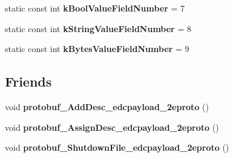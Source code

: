 \begin{DoxyCompactItemize}
\item 
\hypertarget{classedcdatatypes_1_1_edc_payload___edc_metric_af4e33f8c7adc37d9f860fcecbd07c1eb}{static const int {\bfseries k\-Bool\-Value\-Field\-Number} = 7}\label{classedcdatatypes_1_1_edc_payload___edc_metric_af4e33f8c7adc37d9f860fcecbd07c1eb}

\item 
\hypertarget{classedcdatatypes_1_1_edc_payload___edc_metric_ac744b37a44d19f9ce623ad990e7b41f3}{static const int {\bfseries k\-String\-Value\-Field\-Number} = 8}\label{classedcdatatypes_1_1_edc_payload___edc_metric_ac744b37a44d19f9ce623ad990e7b41f3}

\item 
\hypertarget{classedcdatatypes_1_1_edc_payload___edc_metric_a990ff24be183301f661274b2b267a0bf}{static const int {\bfseries k\-Bytes\-Value\-Field\-Number} = 9}\label{classedcdatatypes_1_1_edc_payload___edc_metric_a990ff24be183301f661274b2b267a0bf}

\end{DoxyCompactItemize}
\subsection*{Friends}
\begin{DoxyCompactItemize}
\item 
\hypertarget{classedcdatatypes_1_1_edc_payload___edc_metric_ad13cfbf79a53586d1a436cf24430949c}{void {\bfseries protobuf\-\_\-\-Add\-Desc\-\_\-edcpayload\-\_\-2eproto} ()}\label{classedcdatatypes_1_1_edc_payload___edc_metric_ad13cfbf79a53586d1a436cf24430949c}

\item 
\hypertarget{classedcdatatypes_1_1_edc_payload___edc_metric_ab647c246a2851f27e483b2ddb5dac445}{void {\bfseries protobuf\-\_\-\-Assign\-Desc\-\_\-edcpayload\-\_\-2eproto} ()}\label{classedcdatatypes_1_1_edc_payload___edc_metric_ab647c246a2851f27e483b2ddb5dac445}

\item 
\hypertarget{classedcdatatypes_1_1_edc_payload___edc_metric_aaa1f6cfe98731937eb4a2c1c2a368990}{void {\bfseries protobuf\-\_\-\-Shutdown\-File\-\_\-edcpayload\-\_\-2eproto} ()}\label{classedcdatatypes_1_1_edc_payload___edc_metric_aaa1f6cfe98731937eb4a2c1c2a368990}

\end{DoxyCompactItemize}


